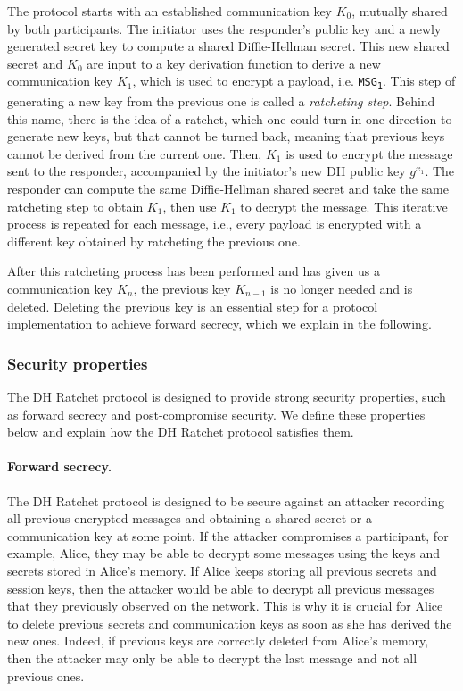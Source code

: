 The protocol starts with an established communication key $K_0$, mutually shared by both participants.
The initiator uses the responder's public key and a newly generated secret key to compute a shared Diffie-Hellman secret.
This new shared secret and $K_0$ are input to a key derivation function to derive a new communication key $K_1$, which is used to encrypt a payload, i.e. \texttt{MSG\textsubscript{1}}.
This step of generating a new key from the previous one is called a \emph{ratcheting step}.
Behind this name, there is the idea of a ratchet, which one could turn in one direction to generate new keys, but that cannot be turned back, meaning that previous keys cannot be derived from the current one.
Then, $K_1$ is used to encrypt the message sent to the responder, accompanied by the initiator's new DH public key $g^{x_1}$.
The responder can compute the same Diffie-Hellman shared secret and take the same ratcheting step to obtain $K_1$, then use $K_1$ to decrypt the message.
This iterative process is repeated for each message, i.e., every payload is encrypted with a different key obtained by ratcheting the previous one.

After this ratcheting process has been performed and has given us a communication key $K_n$, the previous key $K_{n-1}$ is no longer needed and is deleted.
Deleting the previous key is an essential step for a protocol implementation to achieve forward secrecy, which we explain in the following.

\subsubsection{Security properties}
\label{sec:security-properties}

The DH Ratchet protocol is designed to provide strong security properties, such as forward secrecy and post-compromise security.
We define these properties below and explain how the DH Ratchet protocol satisfies them.

\paragraph{Forward secrecy.}
\label{sec:forward-secrecy}

The DH Ratchet protocol is designed to be secure against an attacker recording all previous encrypted messages and obtaining a shared secret or a communication key at some point.
If the attacker compromises a participant, for example, Alice, they may be able to decrypt some messages using the keys and secrets stored in Alice's memory. If Alice keeps storing all previous secrets and session keys, then the attacker would be able to decrypt all previous messages that they previously observed on the network. This is why it is crucial for Alice to delete previous secrets and communication keys as soon as she has derived the new ones.
Indeed, if previous keys are correctly deleted from Alice's memory, then the attacker may only be able to decrypt the last message and not all previous ones.

